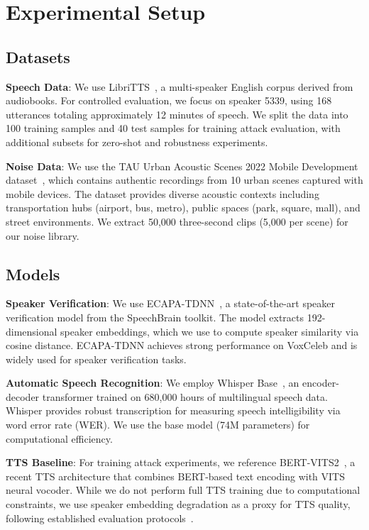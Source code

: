 \section{Experimental Setup}

\subsection{Datasets}

\textbf{Speech Data}: We use LibriTTS~\citep{libritts}, a multi-speaker English corpus derived from audiobooks. For controlled evaluation, we focus on speaker 5339, using 168 utterances totaling approximately 12 minutes of speech. We split the data into 100 training samples and 40 test samples for training attack evaluation, with additional subsets for zero-shot and robustness experiments.

\textbf{Noise Data}: We use the TAU Urban Acoustic Scenes 2022 Mobile Development dataset~\citep{tau_dataset}, which contains authentic recordings from 10 urban scenes captured with mobile devices. The dataset provides diverse acoustic contexts including transportation hubs (airport, bus, metro), public spaces (park, square, mall), and street environments. We extract 50,000 three-second clips (5,000 per scene) for our noise library.

\subsection{Models}

\textbf{Speaker Verification}: We use ECAPA-TDNN~\citep{ecapa}, a state-of-the-art speaker verification model from the SpeechBrain toolkit. The model extracts 192-dimensional speaker embeddings, which we use to compute speaker similarity via cosine distance. ECAPA-TDNN achieves strong performance on VoxCeleb and is widely used for speaker verification tasks.

\textbf{Automatic Speech Recognition}: We employ Whisper Base~\citep{whisper}, an encoder-decoder transformer trained on 680,000 hours of multilingual speech data. Whisper provides robust transcription for measuring speech intelligibility via word error rate (WER). We use the base model (74M parameters) for computational efficiency.

\textbf{TTS Baseline}: For training attack experiments, we reference BERT-VITS2~\citep{bertvits2}, a recent TTS architecture that combines BERT-based text encoding with VITS neural vocoder. While we do not perform full TTS training due to computational constraints, we use speaker embedding degradation as a proxy for TTS quality, following established evaluation protocols~\citep{safespeech}.

